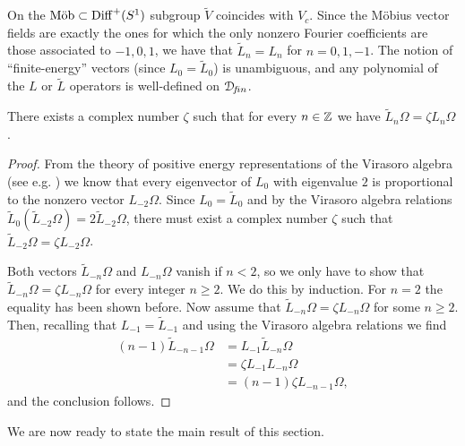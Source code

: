 \documentclass[12pt]{article}
\begin{document}
On the $\text {M\"{o}b} \subset {{\rm Diff}^+(S^1)}$ subgroup $\tilde{V}$ coincides with
$V_c$. Since the M\"obius vector fields are exactly the ones for which the
only nonzero Fourier coefficients are those associated to $-1,0,1$,
we have that $\tilde{L}_n=L_n$ for $n=0,1,-1$. 
The notion of ``finite-energy'' vectors (since $L_0=\tilde{L}_0$) 
is unambiguous, and any polynomial of the $L$ or $\tilde{L}$
operators is well-defined on ${\mathcal D}\!_{f\!in}$.
\begin{lemma}
\label{LOmega}
There exists a complex number $\zeta$ such that for every $n\in 
{\mathbb Z}$ we have $\tilde{L}_n\Omega = \zeta L_n\Omega$.
\end{lemma}
\begin{proof} 
From the theory of positive energy representations of the Virasoro algebra 
(see e.g. \cite{KaRa}) we know that every eigenvector of $L_0$ with eigenvalue 
$2$ is proportional to the nonzero vector $L_{-2} \Omega$. Since
$L_0=\tilde{L}_0$ and by the Virasoro algebra relations 
$\tilde{L}_0(\tilde{L}_{-2}\Omega)=2\tilde{L}_{-2}\Omega$, 
there must exist a
complex number $\zeta$ such that $\tilde{L}_{-2}\Omega=\zeta 
L_{-2}\Omega$.

Both vectors $\tilde{L}_{-n}\Omega$ and $L_{-n}\Omega$ vanish if 
$n<2$, so we only have to show that $\tilde{L}_{-n}\Omega=\zeta
L_{-n}\Omega$ for every integer $n\geq 2$. We do this by induction. 
For $n=2$ the equality has been shown before. 
Now assume that $\tilde{L}_{-n}\Omega=\zeta L_{-n}\Omega$
for some $n\geq 2$. Then, recalling that $L_{-1}=\tilde{L}_{-1}$ 
and using the Virasoro algebra relations we find
\begin{align*} 
(n-1)\tilde{L}_{-n-1}\Omega &= L_{-1}\tilde{L}_{-n}\Omega \\
&= \zeta L_{-1} L_{-n}\Omega \\
&= (n-1)\zeta L_{-n-1}\Omega,
\end{align*}
and the conclusion follows.
\end{proof}

We are now ready to state the main result of this section.
                                                                                       
\end{document}
